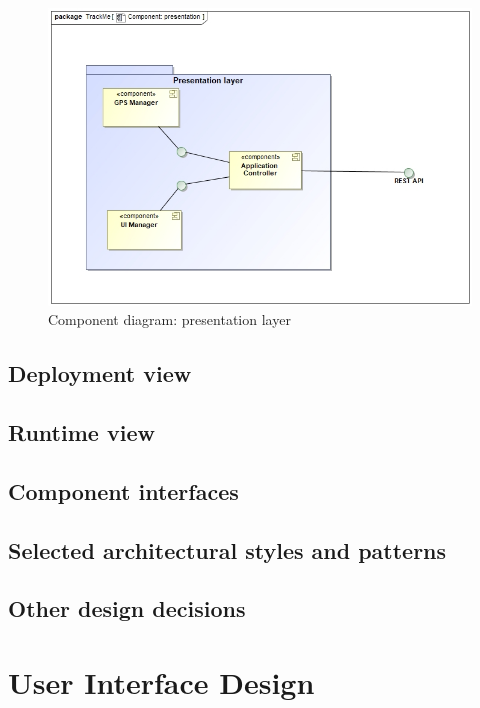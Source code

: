 \documentclass[a4paper]{article}
\begin{document}
 
    
    \begin{figure}[!htpb]
        \centering
        \includegraphics[width=\textwidth]{DD/images/CP.jpg}
        \caption{Component diagram: presentation layer}
    \end{figure}
    \newpage





\subsection{Deployment view}

\subsection{Runtime view}

\subsection{Component interfaces}

\subsection{Selected architectural styles and patterns}

\subsection{Other design decisions}

\section{User Interface Design}
\end{document}
